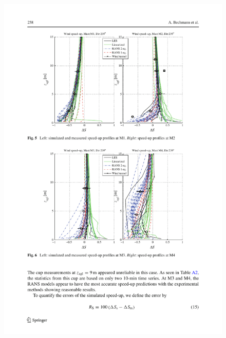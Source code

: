 \begin{figure}[H]
	\centering
	\includegraphics[width=1.0\linewidth,trim={2.7cm 14.4cm 1.9cm 2cm},clip]{bolund3.pdf}%
	

\end{figure}
